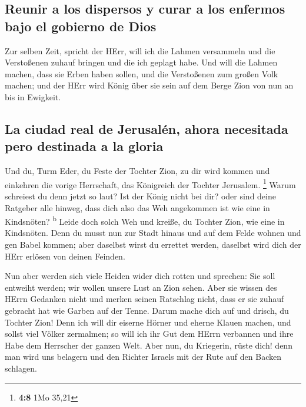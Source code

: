 \hypertarget{reunir-a-los-dispersos-y-curar-a-los-enfermos-bajo-el-gobierno-de-dios}{%
\subsection{Reunir a los dispersos y curar a los enfermos bajo el
gobierno de
Dios}\label{reunir-a-los-dispersos-y-curar-a-los-enfermos-bajo-el-gobierno-de-dios}}

 Zur selben Zeit, spricht der HErr, will ich die Lahmen
versammeln und die Verstoßenen zuhauf bringen und die ich geplagt habe.
 Und will die Lahmen machen, dass sie Erben haben sollen,
und die Verstoßenen zum großen Volk machen; und der HErr wird König über
sie sein auf dem Berge Zion von nun an bis in Ewigkeit.

\hypertarget{la-ciudad-real-de-jerusaluxe9n-ahora-necesitada-pero-destinada-a-la-gloria}{%
\subsection{La ciudad real de Jerusalén, ahora necesitada pero destinada
a la
gloria}\label{la-ciudad-real-de-jerusaluxe9n-ahora-necesitada-pero-destinada-a-la-gloria}}

 Und du, Turm Eder, du Feste der Tochter Zion, zu dir wird
kommen und einkehren die vorige Herrschaft, das Königreich der Tochter
Jerusalem. \footnote{\textbf{4:8} 1Mo 35,21}  Warum
schreiest du denn jetzt so laut? Ist der König nicht bei dir? oder sind
deine Ratgeber alle hinweg, dass dich also das Weh angekommen ist wie
eine in Kindsnöten? \textsuperscript{b}  Leide doch solch
Weh und kreiße, du Tochter Zion, wie eine in Kindsnöten. Denn du musst
nun zur Stadt hinaus und auf dem Felde wohnen und gen Babel kommen; aber
daselbst wirst du errettet werden, daselbst wird dich der HErr erlösen
von deinen Feinden.

 Nun aber werden sich viele Heiden wider dich rotten und
sprechen: Sie soll entweiht werden; wir wollen unsere Lust an Zion
sehen.  Aber sie wissen des HErrn Gedanken nicht und
merken seinen Ratschlag nicht, dass er sie zuhauf gebracht hat wie
Garben auf der Tenne.  Darum mache dich auf und drisch,
du Tochter Zion! Denn ich will dir eiserne Hörner und eherne Klauen
machen, und sollst viel Völker zermalmen; so will ich ihr Gut dem HErrn
verbannen und ihre Habe dem Herrscher der ganzen Welt. 
Aber nun, du Kriegerin, rüste dich! denn man wird uns belagern und den
Richter Israels mit der Rute auf den Backen schlagen.

